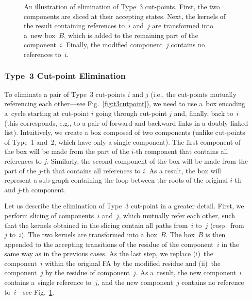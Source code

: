 {\begin{figure}[t]
  \caption{An illustration of elimination of Type~3 cut-points. First, the two components are
  sliced at their accepting states. Next, the kernels of the result containing
  references to~$i$ and~$j$ are transformed into a~new box~$B$, which is added to the remaining part of the component~$i$.
  Finally, the modified component~$j$ contains no references to~$i$.}
  \label{fig:type3folding}
\end{figure}

\subsubsection*{Type~3 Cut-point Elimination}
To eliminate a pair of Type~3 cut-points $i$ and $j$ (i.e., the cut-points
mutually referencing
each other---see Fig.~\ref{fig:t3cutpoint}), we need to use a~box encoding a~cycle
starting at cut-point $i$ going through cut-point $j$ and, finally, back to~$i$ (this
corresponds, e.g., to a pair of forward and backward links in a doubly-linked list).
Intuitively, we create a box composed of two components (unlike cut-points of
Type~1 and~2,
which have only a single component). The first component of the box will be made from the part of the
$i$-th component that contains all references to $j$. Similarly, the second component of
the box will be made from the part of the $j$-th that contains all references to $i$. 
As a result, the box will represent a sub-graph containing the loop between the roots of the original $i$-th and $j$-th component.

Let us describe the elimination of Type~3 cut-point in a greater detail. First, we perform
slicing of components~$i$ and~$j$, which mutually refer each other, such that
the kernels obtained in the slicing
contain all paths from~$i$ to~$j$ (resp.\ from~$j$ to~$i$).
The two kernels are
transformed into a box~$B$. The box~$B$ is then appended to the accepting transitions of
the residue of the component~$i$ in the same way as in the previous cases. As the last step,
we replace (i)~the component~$i$ within the original FA by the modified residue
and (ii)~the component~$j$ by the residue of component~$j$.
As a~result, the new component~$i$ contains a~single reference to~$j$, and the
new component~$j$ contains no reference to~$i$---see
Fig.~\ref{fig:type3folding}.

}
